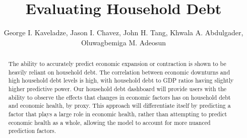 \documentclass[sigconf,nonacm,11pt]{acmart}
\begin{document}
\title{Evaluating Household Debt}


\author{George I. Kaveladze, Jason I. Chavez, John H. Tang, Khwala A. Abdulgader, Oluwagbemiga M. Adeosun}
\affiliation{%
}




\begin{abstract}

The ability to accurately predict economic expansion or contraction is shown to be heavily reliant on household debt.  The correlation between economic downturns and high household debt levels is high, with household debt to GDP ratios having slightly higher predictive power.  Our household debt dashboard will provide users with the ability to observe the effects that changes in economic factors has on household debt and economic health, by proxy.  This approach will differentiate itself by predicting a factor that plays a large role in economic health, rather than attempting to predict economic health as a whole, allowing the model to account for more nuanced prediction factors.\vspace{-0.5em}

\end{abstract}
\end{document}
